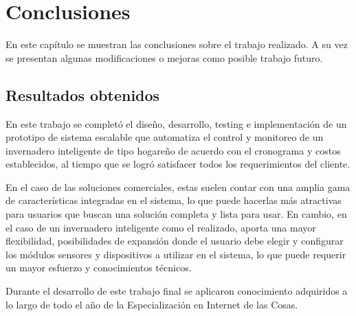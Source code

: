 
\chapter{Conclusiones} %

\label{Chapter5} %





En este capítulo se muestran las conclusiones sobre el trabajo realizado. A su vez
se presentan algunas modificaciones o mejoras como posible trabajo futuro.
\section{Resultados obtenidos }

En este trabajo se completó el diseño, desarrollo, testing e implementación de un
prototipo de sistema escalable que automatiza el control y monitoreo de un invernadero inteligente de tipo hogareño de acuerdo con el cronograma y costos establecidos, al tiempo que se logró satisfacer todos los requerimientos del cliente.


En el caso de las soluciones comerciales, estas suelen contar con una amplia gama de características integradas en el sistema, lo que puede hacerlas más atractivas para usuarios que buscan una solución completa y lista para usar. En cambio, en el caso de un invernadero inteligente como el realizado, aporta una mayor flexibilidad, posibilidades de expansión donde el usuario debe elegir y configurar los módulos sensores y dispositivos a utilizar en el sistema, lo que puede requerir un mayor esfuerzo y conocimientos técnicos. 


Durante el desarrollo de este trabajo final se aplicaron conocimiento adquiridos
a lo largo de todo el año de la Especialización en Internet de las Cosas. 


